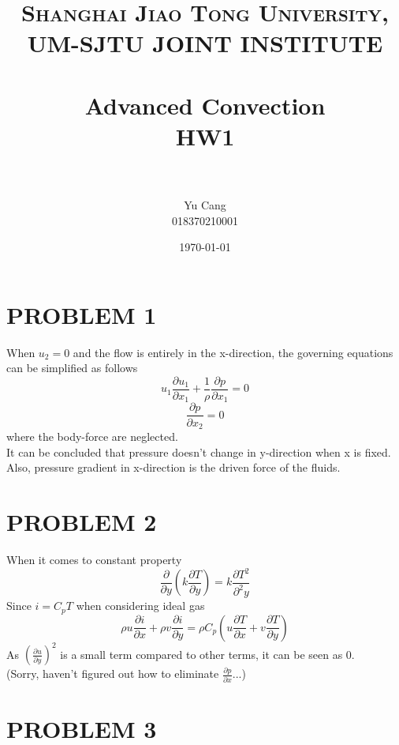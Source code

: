 \documentclass[paper=a4, fontsize=11pt]{scrartcl} %
\title{\normalfont \normalsize 
	\textsc{Shanghai Jiao Tong University, UM-SJTU JOINT INSTITUTE} \\ [25pt]
	\horrule{0.5pt} \\[0.4cm] 
	\huge Advanced Convection \\ HW1 \\
	\horrule{2pt} \\[0.5cm]}
\author{Yu Cang \\ 018370210001}
\date{\normalsize \today}
\numberwithin{equation}{section} %
\numberwithin{figure}{section} %
\numberwithin{table}{section} %
\begin{document}
\maketitle

\section{PROBLEM 1}
When $u_2= 0$ and the flow is entirely in the x-direction, the governing equations can be simplified as follows
\begin{equation}
	u_1 \frac{\partial u_1}{\partial x_1} + \frac{1}{\rho}\frac{\partial p}{\partial x_1} = 0
\end{equation}
\begin{equation}
	\frac{\partial p}{\partial x_2} = 0
\end{equation}
where the body-force are neglected.\\
It can be concluded that pressure doesn't change in y-direction when x is fixed.\\
Also, pressure gradient in x-direction is the driven force of the fluids.

\section{PROBLEM 2}
When it comes to constant property
\begin{equation}
	\frac{\partial}{\partial y}(k\frac{\partial T}{\partial y}) = k \frac{\partial T^2}{\partial^2 y}
\end{equation}
Since $i=C_p T$ when considering ideal gas
\begin{equation}
	\rho u \frac{\partial i}{\partial x} + \rho v \frac{\partial i}{\partial y} = \rho C_p (u\frac{\partial T}{\partial x} + v \frac{\partial T}{\partial y})
\end{equation}
As $(\frac{\partial u}{\partial y})^2$ is a small term compared to other terms, it can be seen as 0.\\
(Sorry, haven't figured out how to eliminate $\frac{\partial p}{\partial x}$...)

\section{PROBLEM 3}
\end{document}
